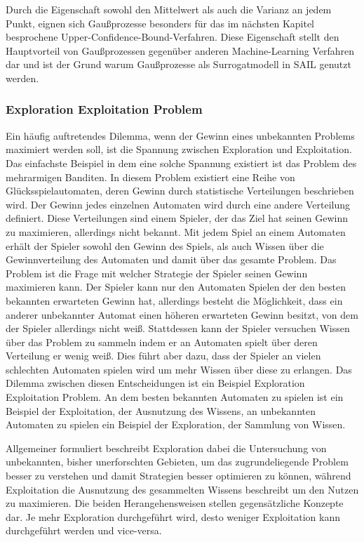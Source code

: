 Durch die Eigenschaft sowohl den Mittelwert als auch die Varianz an jedem Punkt, eignen sich Gaußprozesse besonders für das im nächsten Kapitel besprochene Upper-Confidence-Bound-Verfahren.
Diese Eigenschaft stellt den Hauptvorteil von Gaußprozessen gegenüber anderen Machine-Learning Verfahren dar und ist der Grund warum Gaußprozesse als Surrogatmodell in SAIL genutzt werden.

\subsubsection{Exploration Exploitation Problem}

Ein häufig auftretendes Dilemma, wenn der Gewinn eines unbekannten Problems maximiert werden soll, ist die Spannung zwischen Exploration und Exploitation.
Das einfachste Beispiel in dem eine solche Spannung existiert ist das Problem des mehrarmigen Banditen.
In diesem Problem existiert eine Reihe von Glücksspielautomaten, deren Gewinn durch statistische Verteilungen beschrieben wird.
Der Gewinn jedes einzelnen Automaten wird durch eine andere Verteilung definiert.
Diese Verteilungen sind einem Spieler, der das Ziel hat seinen Gewinn zu maximieren, allerdings nicht bekannt.
Mit jedem Spiel an einem Automaten erhält der Spieler sowohl den Gewinn des Spiels, als auch Wissen über die Gewinnverteilung des Automaten und damit über das gesamte Problem.
Das Problem ist die Frage mit welcher Strategie der Spieler seinen Gewinn maximieren kann.
Der Spieler kann nur den Automaten Spielen der den besten bekannten erwarteten Gewinn hat, allerdings besteht die Möglichkeit, dass ein anderer unbekannter Automat einen höheren erwarteten Gewinn besitzt, von dem der Spieler allerdings nicht weiß.
Stattdessen kann der Spieler versuchen Wissen über das Problem zu sammeln indem er an Automaten spielt über deren Verteilung er wenig weiß. 
Dies führt aber dazu, dass der Spieler an vielen schlechten Automaten spielen wird um mehr Wissen über diese zu erlangen.
Das Dilemma zwischen diesen Entscheidungen ist ein Beispiel Exploration Exploitation Problem.
An dem besten bekannten Automaten zu spielen ist ein Beispiel der Exploitation, der Ausnutzung des Wissens, an unbekannten Automaten zu spielen ein Beispiel der Exploration, der Sammlung von Wissen.

Allgemeiner formuliert beschreibt Exploration dabei die Untersuchung von unbekannten, bisher unerforschten Gebieten, um das zugrundeliegende Problem besser zu verstehen und damit Strategien besser optimieren zu können, während Exploitation die Ausnutzung des gesammelten Wissens beschreibt um den Nutzen zu maximieren.
Die beiden Herangehensweisen stellen gegensätzliche Konzepte dar.
Je mehr Exploration durchgeführt wird, desto weniger Exploitation kann durchgeführt werden und vice-versa.

